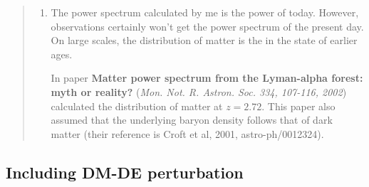 \documentclass{article}
\begin{document}
\begin{quotation}
{\begin{enumerate}
This simply means there are perturbations that will never come into the horizon.

To calculate the power spectrum, one should cut the growth functions at $z=0$ and set the matter perturbation the same then calculate on. Since these are outside of the horizon, today's power spectrum seems weird.

\item
The power spectrum calculated by me is the power of today. However, observations certainly won't get the power spectrum of the present day. On large scales, the distribution of matter is the in the state of earlier ages.

In paper {\bf Matter power spectrum from the Lyman-alpha forest: myth or reality?} ({\it Mon. Not. R. Astron. Soc. 334, 107-116, 2002}) calculated the distribution of matter at $z=2.72$. This paper also assumed that the underlying baryon density follows that of dark matter (their reference is Croft et al, 2001, astro-ph/0012324).





\end{enumerate}











}
\end{quotation}









\subsection{Including DM-DE perturbation}
\end{document}
